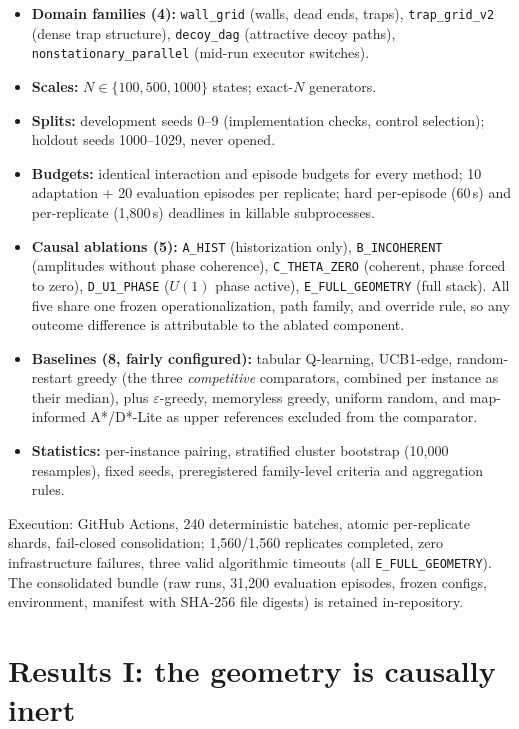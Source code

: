 \documentclass[11pt]{article}
\begin{document}
\begin{itemize}
  \item \textbf{Domain families (4):} \texttt{wall\_grid} (walls, dead ends,
    traps), \texttt{trap\_grid\_v2} (dense trap structure),
    \texttt{decoy\_dag} (attractive decoy paths),
    \texttt{nonstationary\_parallel} (mid-run executor switches).
  \item \textbf{Scales:} $N \in \{100, 500, 1000\}$ states; exact-$N$
    generators.
  \item \textbf{Splits:} development seeds 0--9 (implementation checks,
    control selection); holdout seeds 1000--1029, never opened.
  \item \textbf{Budgets:} identical interaction and episode budgets for
    every method; 10 adaptation $+$ 20 evaluation episodes per replicate;
    hard per-episode (60\,s) and per-replicate (1{,}800\,s) deadlines in
    killable subprocesses.
  \item \textbf{Causal ablations (5):} \texttt{A\_HIST} (historization
    only), \texttt{B\_INCOHERENT} (amplitudes without phase coherence),
    \texttt{C\_THETA\_ZERO} (coherent, phase forced to zero),
    \texttt{D\_U1\_PHASE} ($U(1)$ phase active), \texttt{E\_FULL\_GEOMETRY}
    (full stack). All five share one frozen operationalization, path family,
    and override rule, so any outcome difference is attributable to the
    ablated component.
  \item \textbf{Baselines (8, fairly configured):} tabular Q-learning,
    UCB1-edge, random-restart greedy (the three \emph{competitive}
    comparators, combined per instance as their median), plus
    $\varepsilon$-greedy, memoryless greedy, uniform random, and
    map-informed A*/D*-Lite as upper references excluded from the
    comparator.
  \item \textbf{Statistics:} per-instance pairing, stratified cluster
    bootstrap (10{,}000 resamples), fixed seeds, preregistered family-level
    criteria and aggregation rules.
\end{itemize}

Execution: GitHub Actions, 240 deterministic batches, atomic per-replicate
shards, fail-closed consolidation; 1{,}560/1{,}560 replicates completed,
zero infrastructure failures, three valid algorithmic timeouts (all
\texttt{E\_FULL\_GEOMETRY}). The consolidated bundle (raw runs, 31{,}200
evaluation episodes, frozen configs, environment, manifest with SHA-256 file
digests) is retained in-repository.

\section{Results I: the geometry is causally inert}\label{sec:results1}
\end{document}
